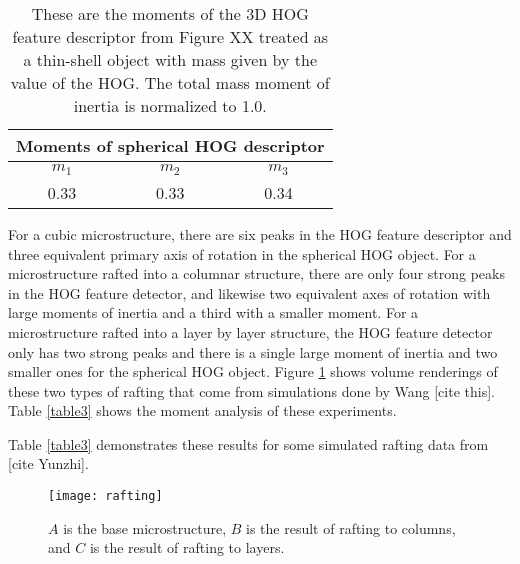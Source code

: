 \documentclass[review]{elsarticle}
\begin{document}
    
    \begin{table}[h]
      \begin{center}
      \begin{tabular}{ c | c | c }
        \multicolumn{3}{c}{Moments of spherical HOG descriptor} \\
        \hline
        $m_1$ & $m_2$ & $m_3$ \\
        \hline
        0.33 & 0.33 & 0.34 \\
        \hline
      \end{tabular}
	  \label{table4}
	  \caption{ These are the moments of the 3D HOG feature descriptor from Figure XX treated as a thin-shell object with mass given by the value of the HOG. The total mass moment of inertia is normalized to 1.0. }
	  \end{center}
  	\end{table}
	
	For a cubic microstructure, there are six peaks in the HOG feature descriptor and three equivalent primary axis of rotation in the spherical HOG object. For a microstructure rafted into a columnar structure, there are only four strong peaks in the HOG feature detector, and likewise two equivalent axes of rotation with large moments of inertia and a third with a smaller moment. For a microstructure rafted into a layer by layer structure, the HOG feature detector only has two strong peaks and there is a single large moment of inertia and two smaller ones for the spherical HOG object. Figure \ref{figure5} shows volume renderings of these two types of rafting that come from simulations done by Wang [cite this]. Table \ref{table3} shows the moment analysis of these experiments.
	
	Table \ref{table3} demonstrates these results for some simulated rafting data from [cite Yunzhi].
	
	\begin{figure}[!ht]
  		\centering
    	\texttt{[image: rafting]}
  		\caption{ $A$ is the base microstructure, $B$ is the result of rafting to columns, and $C$ is the result of rafting to layers. }
  		\label{figure5}
	\end{figure}
	
\end{document}
